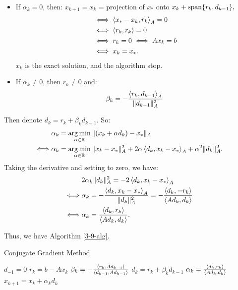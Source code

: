 \documentclass[../main/main.tex]{subfiles}
\begin{document}
\begin{itemize}
\item If $\alpha_{k}=0$, then: $x_{k+1}=x_{k}$ = projection of $x_{*}$ onto $x_{k}+\operatorname{span} \{ r_{k}, d_{k-1}\}, $ \begin{align*} &\iff  \left\langle{x_{*}-x_{k}},{r_{k}}\right\rangle_{A}=0 \\
                                                                                                              &\iff  \left\langle{r_{k}},{r_{k}}\right\rangle=0 \\
                                                                                                              &\iff  r_{k} = 0 \iff  Ax_{k} = b \\
                                                                                                              &\iff  x_{k} = x_{*} .\end{align*}
         $x_{k}$ is the exact solution, and the algorithm stop.
  \item If $\alpha _{k}\neq 0$, then $r_{k}\neq 0$ and: \[
\beta _{k} = -\frac{\left\langle{r_{k}},{d_{k-1}}\right\rangle_{A}}{\|d_{k-1}\|_{A}^2}
        \]
\end{itemize}
Then denote $d_{k}=r_{k} + \beta _{k}d_{k-1}$. So:
\begin{align*}
  &\alpha _{k} = \operatorname*{arg\,min} _{\alpha \in \mathbb{R} } \|(x_{k}+\alpha d_{k})-x_{*}\|_{A}\\
  \iff &\alpha _{k}=\operatorname*{arg\,min}_{\alpha \in \mathbb{R} }\|x_{k}-x_{*}\|_{A}^2 + 2\alpha \left\langle{d_{k}},{x_{k}-x_{*}}\right\rangle_{A}+\alpha ^2\|d_{k}\|_{A}^2
  .\end{align*}
Taking the derivative and setting to zero, we have:
\begin{align*}
  &2\alpha _{k}\|d_{k}\|_{A}^2 = -2 \left\langle{d_{k}},{x_{k}-x_{*}}\right\rangle_{A}\\
  \iff &\alpha _{k}= -\frac{\left\langle{d_{k}},{x_{k}-x_{*}}\right\rangle_{A}}{\|d_{k}\|_{A}^2} = - \frac{\left\langle{d_{k}},{-r_{k}}\right\rangle}{\left\langle{Ad_{k}},{d_{k}}\right\rangle}  \\
  \iff & \alpha _{k} = \frac{\left\langle{d_{k}},{r_{k}}\right\rangle}{\left\langle{Ad_{k}},{d_{k}}\right\rangle}
  .\end{align*}

Thus, we have Algorithm \ref{3-9-alg}.
        \begin{algorithm}[h!]
	\caption{Conjugate Gradient Method}
    \label{3-9-alg}
	\begin{algorithmic}[1]
    \State $d_{-1}=0$
      \State $r_{k}=b-Ax_{k}$
      \State $\beta _{k} = - \frac{\left\langle{r_{k}},{Ad_{k-1}}\right\rangle}{\left\langle{d_{k-1}},{Ad_{k-1}}\right\rangle} $
      \State $d_{k}= r_{k}+\beta _{k}d_{k-1}$
      \State $\alpha _{k} = \frac{\left\langle{d_{k}},{r_{k}}\right\rangle}{\left\langle{Ad_{k}},{d_{k}}\right\rangle} $
      \State $x_{k+1} = x_{k} +\alpha _{k}d_{k}$
      \EndFor
	\end{algorithmic}
	\end{algorithm}
\end{document}
